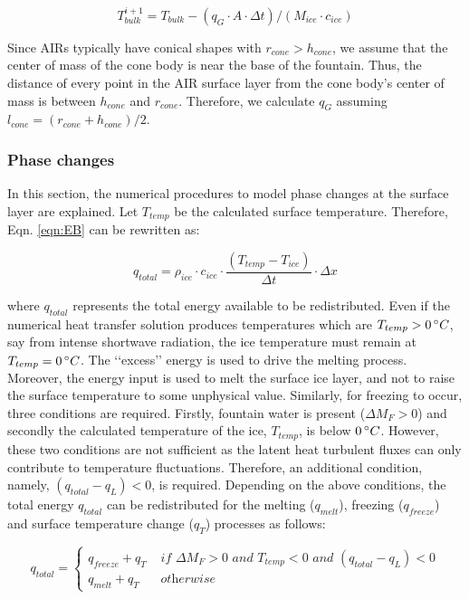 \begin{equation} T_{bulk}^{i+1} = T_{bulk} - (q_{G} \cdot A \cdot \Delta t)/(M_{ice} \cdot c_{ice}) \end{equation}

Since AIRs typically have conical shapes with $r_{cone} > h_{cone}$, we assume that the center of mass of the cone
body is near the base of the fountain. Thus, the distance of every point in the AIR surface layer from the cone
body's center of mass is between $h_{cone}$ and $r_{cone}$. Therefore, we calculate $q_{G}$ assuming $l_{cone} = (r_{cone} +
	h_{cone})/2$.

\subsubsection{Phase changes}\label{sec:phase}

In this section, the numerical procedures to model phase changes at the surface layer are explained. Let
$T_{temp}$ be the calculated surface temperature. Therefore, Eqn. \ref{eqn:EB} can be rewritten as:

$$q_{total} =\rho_{ice} \cdot c_{ice} \cdot \frac{(T_{temp}-T_{ice})}{\Delta t} \cdot \Delta x$$

where $q_{total}$ represents the total energy available to be redistributed. Even if the numerical heat transfer
solution produces temperatures which are $T_{temp}>0\, ^{\circ} C$, say from intense shortwave radiation, the ice
temperature must remain at $T_{temp} = 0\, ^{\circ} C$. The ‘‘excess’’ energy is used to drive the melting
process. Moreover, the energy input is used to melt the surface ice layer, and not to raise the surface
temperature to some unphysical value. Similarly, for freezing to occur, three conditions are required. Firstly,
fountain water is present ($\Delta M_{F} > 0 $) and secondly the calculated temperature of the ice, $T_{temp}$,
is below $0\, ^{\circ} C$. However, these two conditions are not sufficient as the latent heat turbulent fluxes
can only contribute to temperature fluctuations. Therefore, an additional condition, namely, $(q_{total}-q_{L})
< 0$, is required. Depending on the above conditions, the total energy $q_{total}$ can be redistributed
for the melting ($q_{melt}$), freezing ($q_{freeze}$) and surface temperature change ($q_{T}$) processes as
follows:

\begin{equation}
	q_{total} = \left\{ \begin{array}{ll}
		q_{freeze} + q_{T} & \textit{ if } \Delta M_{F} > 0 \textit{ and } T_{temp} < 0 \textit{ and }(q_{total}-q_{L}) < 0 \\
		q_{melt} + q_{T}   & \textit{ otherwise}
	\end{array} \right.
\end{equation}

